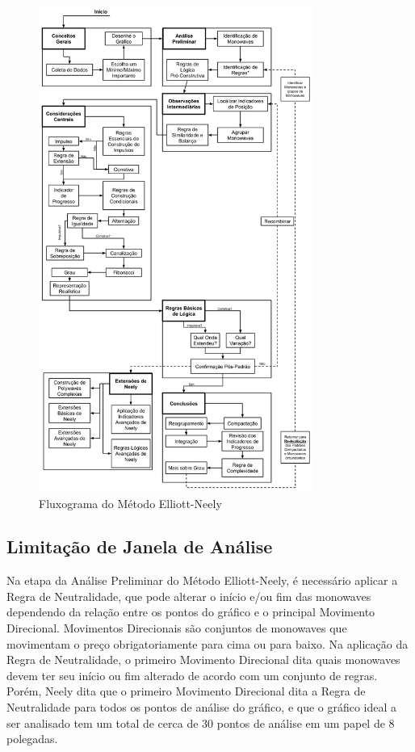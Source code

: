 \documentclass[12pt]{article}
\begin{document}
\begin{figure}[H]
	\centering
	\includegraphics[width=0.8\textwidth]{Elliott-NeelyMethod.png}
	\caption{Fluxograma do Método Elliott-Neely}\label{fig:Elliott-NeelyMethod}
\end{figure}

\subsection{Limitação de Janela de Análise}

Na etapa da Análise Preliminar do Método Elliott-Neely, é necessário aplicar a Regra
de Neutralidade, que pode alterar o início e/ou fim das monowaves dependendo da relação entre
os pontos do gráfico e o principal Movimento Direcional. Movimentos Direcionais são conjuntos
de monowaves que movimentam o preço obrigatoriamente para cima ou para baixo. Na aplicação da
Regra de Neutralidade, o primeiro Movimento Direcional dita quais monowaves devem ter seu
início ou fim alterado de acordo com um conjunto de regras. Porém, Neely dita que o primeiro
Movimento Direcional dita a Regra de Neutralidade para todos os pontos de análise do gráfico,
e que o gráfico ideal a ser analisado tem um total de cerca de 30 pontos de análise em um papel
de 8 polegadas.
\end{document}
